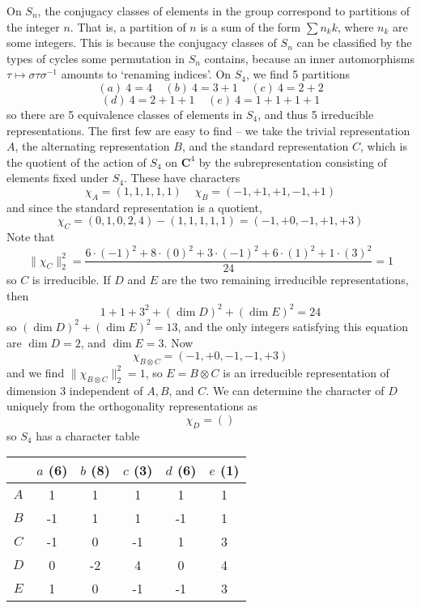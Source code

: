 \begin{example}
    On $S_n$, the conjugacy classes of elements in the group correspond to partitions of the integer $n$. That is, a partition of $n$ is a sum of the form $\sum n_k k$, where $n_k$ are some integers. This is because the conjugacy classes of $S_n$ can be classified by the types of cycles some permutation in $S_n$ contains, because an inner automorphisms $\tau \mapsto \sigma \tau \sigma^{-1}$ amounts to `renaming indices'. On $S_4$, we find 5 partitions
    \[ (a)\ 4 = 4\ \ \ \ \ (b)\ 4 = 3 + 1\ \ \ \ \ (c)\ 4 = 2 + 2 \]
    \[ (d)\ 4 = 2 + 1 + 1\ \ \ \ \ (e)\ 4 = 1 + 1 + 1 + 1 \]
    so there are 5 equivalence classes of elements in $S_4$, and thus 5 irreducible representations. The first few are easy to find -- we take the trivial representation $A$, the alternating representation $B$, and the standard representation $C$, which is the quotient of the action of $S_4$ on $\mathbf{C}^4$ by the subrepresentation consisting of elements fixed under $S_4$. These have characters
    \[ \chi_A = (1,1,1,1,1)\ \ \ \ \ \chi_B = (-1,+1,+1,-1,+1) \]
    and since the standard representation is a quotient,
    \[ \chi_C = (0,1,0,2,4) - (1,1,1,1,1) = (-1,+0,-1,+1,+3) \]
    Note that
    \[ \| \chi_C \|_2^2 = \frac{6 \cdot (-1)^2 + 8 \cdot (0)^2 + 3 \cdot (-1)^2 + 6 \cdot (1)^2 + 1 \cdot (3)^2}{24} = 1 \]
    so $C$ is irreducible. If $D$ and $E$ are the two remaining irreducible representations, then
    \[ 1 + 1 + 3^2 + (\dim D)^2 + (\dim E)^2 = 24 \]
    so $(\dim D)^2 + (\dim E)^2 = 13$, and the only integers satisfying this equation are $\dim D = 2$, and $\dim E = 3$. Now
    \[ \chi_{B \otimes C} = (-1,+0,-1,-1,+3) \]
    and we find $\| \chi_{B \otimes C} \|_2^2 = 1$, so $E = B \otimes C$ is an irreducible representation of dimension 3 independent of $A,B$, and $C$. We can determine the character of $D$ uniquely from the orthogonality representations as
    \[ \chi_D = () \]
    so $S_4$ has a character table
    \begin{center}
    \begin{tabular}{|c|c|c|c|c|c|}
    \hline
        & $a$ (6) & $b$ (8) & $c$ (3) & $d$ (6) & $e$ (1) \\
    \hline
    $A$ & 1 & 1 & 1 & 1 & 1 \\
    $B$ & -1 & 1 & 1 & -1 & 1 \\
    $C$ & -1 & 0 & -1 & 1 & 3 \\
    $D$ & 0 & -2 & 4 & 0 & 4 \\
    $E$ & 1 & 0 & -1 & -1 & 3 \\
    \hline
    \end{tabular}
    \end{center}
\end{example}

